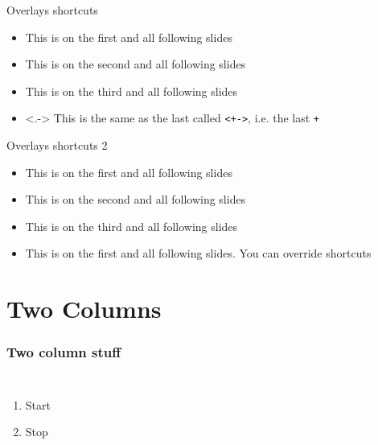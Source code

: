 \begin{frame}[fragile]{Overlays shortcuts} %
	\begin{itemize}
		\item<+-> This is on the first and all following slides
		\item<+-> This is on the second and all following slides
		\item<+-> This is on the third and all following slides
		\item<.-> This is the same as the last called \verb|<+->|, i.e. the last \verb|+|
	\end{itemize}
\end{frame}






\begin{frame}{Overlays shortcuts 2}
	\begin{itemize}[<+->]
		\item This is on the first and all following slides
		\item This is on the second and all following slides
		\item This is on the third and all following slides
		\item<1-> This is on the first and all following slides. You can override shortcuts
	\end{itemize}
\end{frame}









\section{Two Columns}

\begin{frame}
	\frametitle{Two column stuff}
    \begin{columns}
                 \begin{enumerate}
                 \item Start
                 \item Stop
                 \end{enumerate}
    \end{columns}
\end{frame}
















